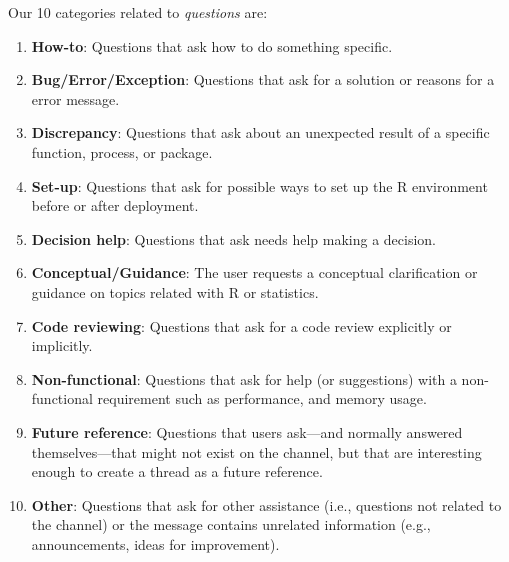 \documentclass{sig-alternate-05-2015}
\begin{document}
	Our 10 categories related to \textit{questions} are:
	\begin{enumerate}[\bfseries (1)]
	\item \textbf{How-to}: Questions that ask how to do something specific.
	\item \textbf{Bug/Error/Exception}: Questions that ask for a solution or reasons for a error message.
	\item \textbf{Discrepancy}: Questions that ask about an unexpected result of a specific function, process, or package.
	\item \textbf{Set-up}: Questions that ask for possible ways to set up the R environment before or after deployment.
	\item \textbf{Decision help}: Questions that ask needs help making a decision.
	\item \textbf{Conceptual/Guidance}: The user requests a conceptual clarification or guidance on topics related with R or statistics.
	\item \textbf{Code reviewing}: Questions that ask for a code review explicitly or implicitly.
	\item \textbf{Non-functional}: Questions that ask for help (or suggestions) with a non-functional requirement such as performance, and memory usage.
	\item \textbf{Future reference}: Questions that users ask---and normally answered themselves---that might not exist on the channel, but that are interesting enough to create a thread as a future reference.
	\item \textbf{Other}: Questions that ask for other assistance (i.e., questions not related to the channel) or the message contains unrelated information (e.g., announcements, ideas for improvement).

	\end{enumerate}


\end{document}
